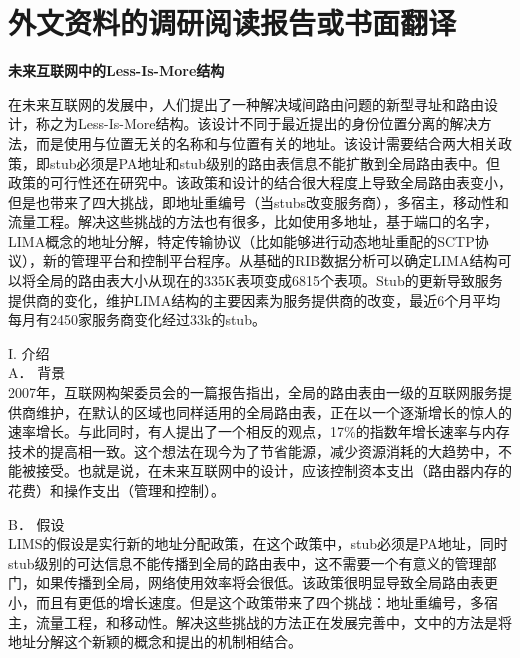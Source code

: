 
%


\chapter{外文资料的调研阅读报告或书面翻译}

\textbf{未来互联网中的Less-Is-More结构\cite{lima}}

在未来互联网的发展中，人们提出了一种解决域间路由问题的新型寻址和路由设计，称之为Less-Is-More结构。该设计不同于最近提出的身份位置分离的解决方法，而是使用与位置无关的名称和与位置有关的地址。该设计需要结合两大相关政策，即stub必须是PA地址和stub级别的路由表信息不能扩散到全局路由表中。但政策的可行性还在研究中。该政策和设计的结合很大程度上导致全局路由表变小，但是也带来了四大挑战，即地址重编号（当stubs改变服务商），多宿主，移动性和流量工程。解决这些挑战的方法也有很多，比如使用多地址，基于端口的名字，LIMA概念的地址分解，特定传输协议（比如能够进行动态地址重配的SCTP协议），新的管理平台和控制平台程序。从基础的RIB数据分析可以确定LIMA结构可以将全局的路由表大小从现在的335K表项变成6815个表项。Stub的更新导致服务提供商的变化，维护LIMA结构的主要因素为服务提供商的改变，最近6个月平均每月有2450家服务商变化经过33k的stub。

I.	介绍\\
A．	背景\\
2007年，互联网构架委员会的一篇报告指出，全局的路由表由一级的互联网服务提供商维护，在默认的区域也同样适用的全局路由表，正在以一个逐渐增长的惊人的速率增长。与此同时，有人提出了一个相反的观点，17\%的指数年增长速率与内存技术的提高相一致。这个想法在现今为了节省能源，减少资源消耗的大趋势中，不能被接受。也就是说，在未来互联网中的设计，应该控制资本支出（路由器内存的花费）和操作支出（管理和控制）。


B．	假设\\
LIMS的假设是实行新的地址分配政策，在这个政策中，stub必须是PA地址，同时stub级别的可达信息不能传播到全局的路由表中，这不需要一个有意义的管理部门，如果传播到全局，网络使用效率将会很低。该政策很明显导致全局路由表更小，而且有更低的增长速度。但是这个政策带来了四个挑战：地址重编号，多宿主，流量工程，和移动性。解决这些挑战的方法正在发展完善中，文中的方法是将地址分解这个新颖的概念和提出的机制相结合。


